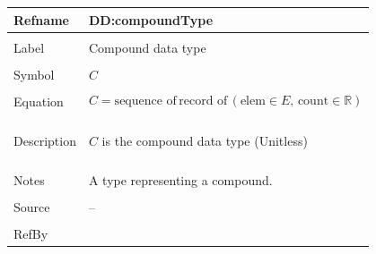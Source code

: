 \documentclass[12pt]{article}
\begin{document}
\vspace{\baselineskip}
\noindent
\begin{minipage}{\textwidth}
\begin{tabular}{>{\raggedright}p{}>{\raggedright\arraybackslash}p{}}
\toprule \textbf{Refname} & \textbf{DD:compoundType}
\label{DD:compoundType}
\\ \midrule \\
Label & Compound data type
        
\\ \midrule \\
Symbol & $C$
         
\\ \midrule \\
Equation & \begin{displaymath}
           C=\text{sequence of}\,\text{record of}\,\left(\text{elem}\in{}E,\,\text{count}\in{}\mathbb{R}\right)
           \end{displaymath}
\\ \midrule \\
Description & \begin{symbDescription}
              \item{$C$ is the compound data type (Unitless)}
              \end{symbDescription}
\\ \midrule \\
Notes & A type representing a compound.
        
\\ \midrule \\
Source & --
         
\\ \midrule \\
RefBy & 
\\ \bottomrule
\end{tabular}
\end{minipage}
\vspace{\baselineskip}
\noindent
\end{document}
